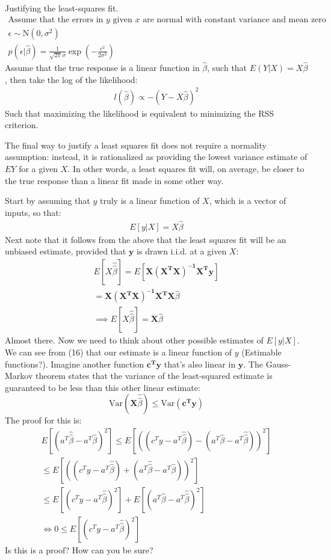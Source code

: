 \documentclass[11pt,a4paper,article]{memoir} %
\begin{document}
Justifying the least-squares fit.
\begin{gather}
	\text{Assume that the errors in $y$ given $x$ are normal with constant variance and mean zero}\\
	\epsilon \sim \text{N}(0, \sigma^2) \\
	p(\epsilon|\hat{\beta}) = \frac{1}{\sqrt{2\pi}\sigma} \exp (-\frac{\epsilon^2}{2\sigma^2})
\end{gather}
Assume that the true response is a linear function in $\hat{\beta}$, such that $E(Y|X) = X\hat{\beta}$, then take the log of the likelihood:
\begin{gather}
	l(\hat{\beta}) \propto -(Y - X\hat{\beta})^2
\end{gather}
Such that maximizing the likelihood is equivalent to minimizing the RSS criterion.

The final way to justify a least squares fit does not require a normality assumption: instead, it is rationalized as providing the lowest variance estimate of $EY$ for a given $X$. In other words, a least squares fit will, on average, be closer to the true response than a linear fit made in some other way.

Start by assuming that $y$ truly is a linear function of $X$, which is a vector of inputs, so that:
\begin{gather}
	E[y|X] = X\hat{\beta} 
\end{gather}
Next note that it follows from the above that the least squares fit will be an unbiased estimate, provided that $\boldsymbol{y}$ is drawn i.i.d. at a given $X$:
\begin{gather}
	E[X\hat{\hat{\beta}}] = E[\boldsymbol{X(X^T X)^{-1}X^T y}] \\
	= \boldsymbol{X(X^T X)^{-1}X^T X}\hat{\beta} \\
	\implies E[X\hat{\hat{\beta}}] = \boldsymbol{X}\hat{\beta}
\end{gather}
Almost there. Now we need to think about other possible estimates of $E[y|X]$. We can see from (16) that our estimate is a linear function of $y$ (Estimable functions?). Imagine another function $\boldsymbol{c^T y}$ that's also linear in $\boldsymbol{y}$. The Gauss-Markov theorem states that the variance of the least-squared estimate is guaranteed to be less than this other linear estimate:
\begin{equation}
	\text{Var}(\boldsymbol{X}\hat{\hat{\beta}}) \leq \text{Var}(\boldsymbol{c^Ty})
\end{equation} 
The proof for this is:
\begin{gather}
	E[(a^T \hat{\hat{\beta}} - a^T \hat{\beta})^2] \leq E[((c^T y - a^T \hat{\hat{\beta}}) - ( a^T \hat{\beta} - a^T \hat{\hat{\beta}}))^2]\\
	\leq  E[((c^T y - a^T \hat{\hat{\beta}}) + ( a^T \hat{\hat{\beta}} - a^T \hat{\beta}))^2] \\
	\leq E[(c^T y - a^T \hat{\hat{\beta}})^2] + E[( a^T \hat{\beta} - a^T \hat{\hat{\beta}})^2] \\
	\iff 0 \leq E[(c^T y - a^T \hat{\hat{\beta}})^2]
\end{gather}
Is this is a proof? How can you be sure?
\end{document}
